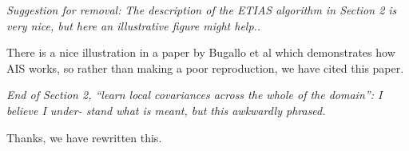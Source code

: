 \documentclass{article}
\newcommand{\comment}[2]{\vspace{0.6cm}{\bf Comment:} {\it #1.}

\vspace{0.3cm}{\bf Answer:} #2}
\begin{document}

\comment{Suggestion for removal: The description of the ETIAS algorithm in Section 2 is very nice, but here an illustrative figure might help.}{There is a nice illustration in a paper by Bugallo et al which demonstrates how AIS works, so rather than making a poor reproduction, we have cited this paper.}


\comment{End of Section 2, “learn local covariances across the whole of the domain”: I believe I under- stand what is meant, but this awkwardly phrased}{Thanks, we have rewritten this.}

\end{document}
